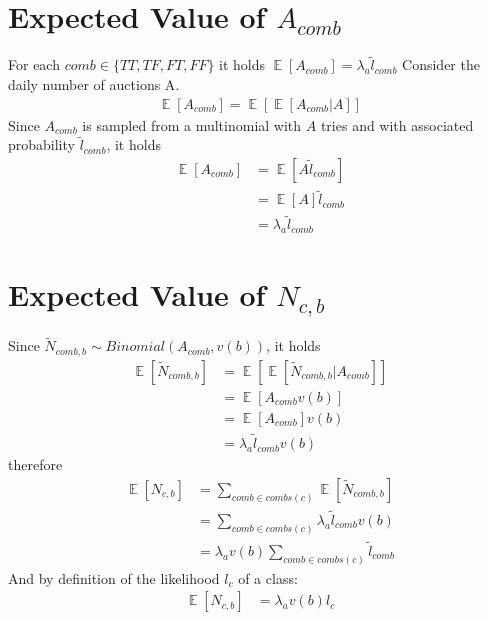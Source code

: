 \documentclass[11pt]{article} %
\DeclareMathOperator{\EX}{\mathbb{E}}
\begin{document}
\clearpage
{\footnotesize}


\clearpage
\appendix

\section{Expected Value of $A_{comb}$}\label{sec.acombproof}
For each $comb \in \{TT,TF,FT,FF\}$ it holds $\EX[A_{comb}] = \lambda_a \tilde{l}_{comb}$
\newline
\newline
Consider the daily number of auctions A.
\begin{align*}
\EX\left[A_{comb}\right] = \EX\left[\EX\left[A_{comb}|A\right]\right]
\end{align*}
Since $A_{comb}$ is sampled from a multinomial with $A$ tries and with associated probability $\tilde{l}_{comb}$, it holds
\begin{align*}
\EX\left[A_{comb}\right] &= \EX\left[A\tilde{l}_{comb}\right]\\
&= \EX\left[A\right]\tilde{l}_{comb}\\
&= \lambda_a\tilde{l}_{comb}
\end{align*}

\section{Expected Value of $N_{c,b}$}\label{sec.ncbproof}
Since $\tilde{N}_{comb,b} \sim Binomial(A_{comb}, v(b))$, it holds
\begin{align*}
\EX\left[\tilde{N}_{comb,b}\right] &= \EX\left[\EX\left[\tilde{N}_{comb,b}| A_{comb}\right]\right]\\
 &= \EX\left[A_{comb}v(b)\right]\\
 &= \EX\left[A_{comb}\right]v(b)\\
&= \lambda_a\tilde{l}_{comb}v(b)
\end{align*}
therefore
\begin{align*}
\EX\left[N_{c,b}\right] &= \sum_{comb \in combs(c)}{\EX\left[\tilde{N}_{comb,b}\right]}\\
&= \sum_{comb \in combs(c)}{\lambda_a\tilde{l}_{comb}v(b)}\\
&= \lambda_av(b)\sum_{comb \in combs(c)}{\tilde{l}_{comb}}
\end{align*}
And by definition of the likelihood $l_c$ of a class:
\begin{align*}
\EX\left[N_{c,b}\right]&= \lambda_av(b)l_c
\end{align*}
\end{document}
